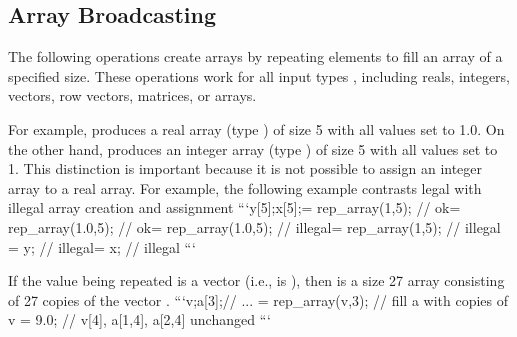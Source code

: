 \begin{description}
\begin{description}
\begin{description}
\begin{description}
\begin{description}
\begin{description}
\begin{description}
\begin{description}
\begin{description}
\begin{description}
\begin{description}
\begin{description}
\begin{description}
\begin{description}
\begin{description}
\begin{description}
\begin{description}
\begin{description}
\begin{description}
\begin{description}
\begin{description}
\begin{description}
\begin{description}
\begin{description}
\begin{description}
\begin{description}
\begin{description}
\begin{description}
\begin{description}
\begin{description}
\section{Array Broadcasting}

The following operations create arrays by repeating elements to fill an array of a specified size.  These operations work for all input types , including reals, integers, vectors, row vectors, matrices, or arrays.

\begin{description}  %

For example,  produces a real array (type ) of size 5 with all values set to 1.0.  On the other hand,  produces an integer array (type ) of size 5 with all values set to 1.  This distinction is important because it is not possible to assign an integer array to a real array.  For example, the following example contrasts legal with illegal array creation and assignment
```\nreal y[5];\nint x[5];\nx = rep_array(1,5); // ok\ny = rep_array(1.0,5);  // ok\nx = rep_array(1.0,5);  // illegal\ny = rep_array(1,5);     // illegal \nx = y;                  // illegal\ny = x;                  // illegal \n```

If the value being repeated  is a vector (i.e.,  is ), then  is a size 27 array consisting of 27 copies of the vector .
```\nvector[5] v;\nvector[5] a[3];\n// ... \na = rep_array(v,3);  // fill a with copies of v \na[2,4] = 9.0;        // v[4], a[1,4], a[2,4] unchanged \n```


\end{description}
\end{description}
\end{description}
\end{description}
\end{description}
\end{description}
\end{description}
\end{description}
\end{description}
\end{description}
\end{description}
\end{description}
\end{description}
\end{description}
\end{description}
\end{description}
\end{description}
\end{description}
\end{description}
\end{description}
\end{description}
\end{description}
\end{description}
\end{description}
\end{description}
\end{description}
\end{description}
\end{description}
\end{description}
\end{description}
\end{description}
